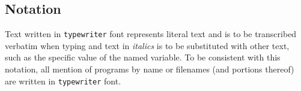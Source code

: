 \documentclass{article}
\begin{document}
\subsection{Notation}

Text written in {\tt typewriter} font represents literal text and is to be transcribed verbatim when typing and text in {\em italics} is to be substituted with other text, such as the specific value of the named variable.
To be consistent with this notation, all mention of programs by name or filenames (and portions thereof) are written in {\tt typewriter} font.
























\end{document}
